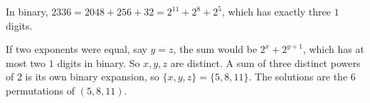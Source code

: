 In binary, $2336=2048+256+32=2^{11}+2^8+2^5$, which has exactly three $1$ digits.

If two exponents were equal, say $y=z$, the sum would be $2^x+2^{y+1}$, which has at most two $1$ digits in binary. So $x,y,z$ are distinct. A sum of three distinct powers of $2$ is its own binary expansion, so $\{x,y,z\}=\{5,8,11\}$. The solutions are the $\boxed{6}$ permutations of $(5,8,11)$.
